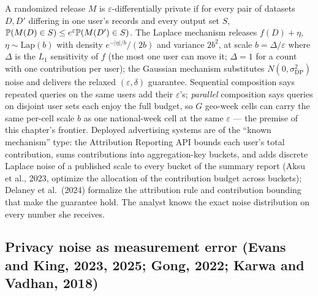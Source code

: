 A randomized release $M$ is $\varepsilon$-differentially private if for every pair of datasets $D, D'$ differing in one user's records and every output set $S$, $\mathbb{P}(M(D) \in S) \le e^{\varepsilon}\mathbb{P}(M(D') \in S)$. The Laplace mechanism releases $f(D) + \eta$, $\eta \sim \mathrm{Lap}(b)$ with density $e^{-|\eta|/b}/(2b)$ and variance $2b^2$, at scale $b = \Delta/\varepsilon$ where $\Delta$ is the $L_1$ sensitivity of $f$ (the most one user can move it; $\Delta = 1$ for a count with one contribution per user); the Gaussian mechanism substitutes $N(0,\sigma_{\mathrm{DP}}^2)$ noise and delivers the relaxed $(\varepsilon,\delta)$ guarantee. Sequential composition says repeated queries on the same users add their $\varepsilon$'s; \emph{parallel} composition says queries on disjoint user sets each enjoy the full budget, so $G$ geo-week cells can carry the same per-cell scale $b$ as one national-week cell at the same $\varepsilon$ --- the premise of this chapter's frontier. Deployed advertising systems are of the ``known mechanism'' type: the Attribution Reporting API bounds each user's total contribution, sums contributions into aggregation-key buckets, and adds discrete Laplace noise of a published scale to every bucket of the summary report (Aksu et al., 2023, optimize the allocation of the contribution budget across buckets); Delaney et al.\ (2024) formalize the attribution rule and contribution bounding that make the guarantee hold. The analyst knows the exact noise distribution on every number she receives.

\subsection{Privacy noise as measurement error (Evans and King, 2023, 2025; Gong, 2022; Karwa and Vadhan, 2018)}

